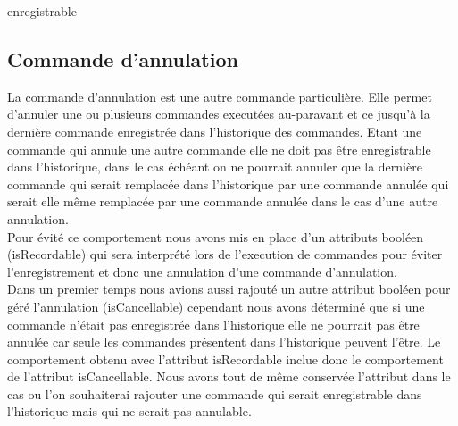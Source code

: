 \documentclass[pdftex,12pt,a4paper]{article}
\begin{document}
     enregistrable\subsection{Commande d'annulation}
 	La commande d'annulation est une autre commande particulière. Elle permet d'annuler une ou plusieurs commandes executées au-paravant et ce jusqu'à la dernière commande enregistrée dans l'historique des commandes. Etant une commande qui annule une autre commande elle ne doit pas être enregistrable dans l'historique, dans le cas échéant on ne pourrait annuler que la dernière commande qui serait remplacée dans l'historique par une commande annulée qui serait elle même remplacée par une commande annulée dans le cas d'une autre annulation.\\ 
    
    Pour évité ce comportement nous avons mis en place d'un attributs booléen (isRecordable)  qui sera interprété lors de l'execution de commandes pour éviter l'enregistrement et donc une annulation d'une commande d'annulation. \\
    
    Dans un premier temps nous avions aussi rajouté un autre attribut booléen pour géré l'annulation (isCancellable) cependant nous avons déterminé que si une commande n'était pas enregistrée dans l'historique elle ne pourrait pas être annulée car seule les commandes présentent dans l'historique peuvent l'être. Le comportement obtenu avec l'attribut isRecordable inclue  donc le comportement de l'attribut isCancellable. Nous avons tout de même conservée l'attribut dans le cas ou l'on souhaiterai rajouter une commande qui serait enregistrable dans l'historique mais qui ne serait pas annulable.
    
     
\end{document}
